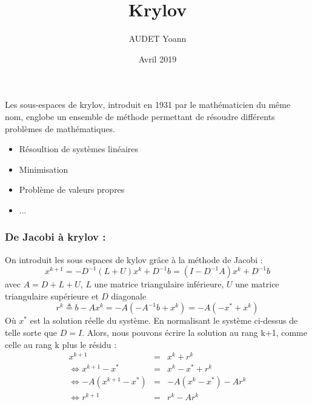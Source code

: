 \documentclass[12pt]{beamer}
\begin{document}
	\author{AUDET Yoann}
	\title{Krylov}
	\date{Avril 2019}
\begin{frame}[plain]
	\maketitle
\end{frame}
\begin{frame}
    Les sous-espaces de krylov, introduit en 1931 par le mathématicien du même nom, englobe un ensemble de méthode permettant de résoudre différents problèmes de mathématiques. 
    \begin{itemize}
        \item Résoultion de systèmes linéaires
        \item Minimisation
        \item Problème de valeurs propres
        \item ...
    \end{itemize}
\end{frame}

\begin{frame}
    \frametitle{De Jacobi à krylov : }
    On introduit les sous espaces de kylov grâce à la méthode de Jacobi :
    \begin{equation}
        x^{k+1} = -D^{-1}(L+U)x^k + D^{-1}b = (I - D^{-1}A)x^{k} + D^{-1}b
    \end{equation}
    avec $A = D + L + U$, $L$ une matrice triangulaire inférieure, $U$ une matrice triangulaire supérieure et $D$ diagonale
    \begin{equation}
        r^k \triangleq b - Ax^k = -A ( - A^{-1}b + x^k) = -A (- x^* + x^k)
    \end{equation}
    Où $x^*$ est la solution réelle du système. En normalisant le système ci-dessus de telle sorte que $D = I$. Alors, nous pouvons écrire la solution au rang k+1, comme celle au rang k plus le résidu : 
    \begin{eqnarray}
    x^{k+1} &=& x^k + r^k\\
    \Leftrightarrow x^{k+1} - x^* &=& x^k - x^* + r^k\\
    \Leftrightarrow -A( x^{k+1} - x^*) &=& -A(x^k - x^*) - Ar^k\\
    \Leftrightarrow r^{k+1} &=& r^k - Ar^k
    \end{eqnarray}

\end{frame}
\end{document}
